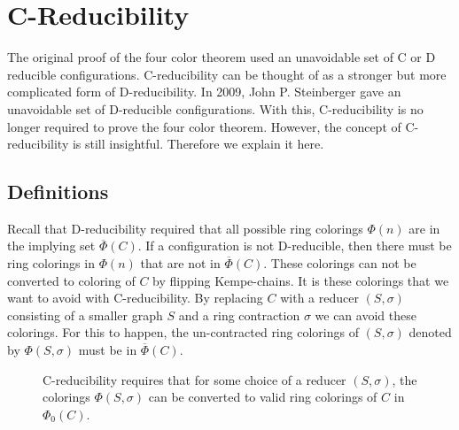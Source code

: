 \section{C-Reducibility}
\label{sec:creduce}

The original proof of the four color theorem used an unavoidable set of C or D reducible configurations. C-reducibility can be thought of as a stronger but more complicated form of D-reducibility. In 2009, John P. Steinberger gave an unavoidable set of D-reducible configurations. With this, C-reducibility is no longer required to prove the four color theorem. However, the concept of C-reducibility is still insightful. Therefore we explain it here.

\subsection{Definitions}

Recall that D-reducibility required that all possible ring colorings $\Phi(n)$ are in the implying set $\overline{\Phi}(C)$. If a configuration is not D-reducible, then there must be ring colorings in $\Phi(n)$ that are not in $\overline{\Phi}(C)$. These colorings can not be converted to coloring of $C$ by flipping Kempe-chains. It is these colorings that we want to avoid with C-reducibility. By replacing $C$ with a reducer $(S,\sigma)$ consisting of a smaller graph $S$ and a ring contraction $\sigma$ we can avoid these colorings. For this to happen, the un-contracted ring colorings of $(S,\sigma)$ denoted by $\Phi(S, \sigma)$ must be in $\overline{\Phi}(C)$.

\begin{figure}[!h]
    \centering

    \caption{C-reducibility requires that for some choice of a reducer $(S,\sigma)$, the colorings $\Phi(S, \sigma)$ can be converted to valid ring colorings of $C$ in $\Phi_0(C)$.}
    \label{fig:cred}
\end{figure}


